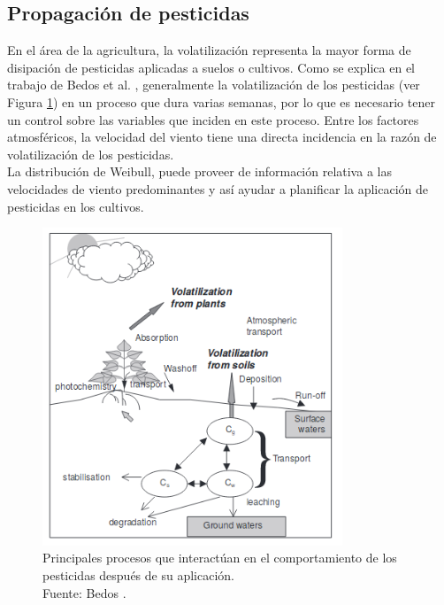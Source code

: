 \subsection{Propagación de pesticidas}
En el área de la agricultura, la volatilización representa la mayor forma de disipación de pesticidas aplicadas a suelos o cultivos. Como se explica en el trabajo de Bedos et al. \cite{Bedos01}, generalmente la volatilización de los pesticidas (ver Figura \ref{fig:ejemplo_pesticidas}) en un proceso que dura varias semanas, por lo que es necesario tener un control sobre las variables que inciden en este proceso. Entre los factores atmosféricos, la velocidad del viento tiene una directa incidencia en la razón de volatilización de los pesticidas.\\
La distribución de Weibull, puede proveer de información relativa a las velocidades de viento predominantes y así ayudar a planificar la aplicación de pesticidas en los cultivos.
\begin{figure}[ht!]
    \centering
    \captionsetup{justification=centering,margin=2cm}
        \includegraphics[width=0.8\textwidth]{figures/pesticide_wind.png} 
    \caption{Principales procesos que interactúan en el comportamiento de los pesticidas después de su aplicación.\\ Fuente: Bedos \cite{Bedos01}.}
    \label{fig:ejemplo_pesticidas}
    
\end{figure}

